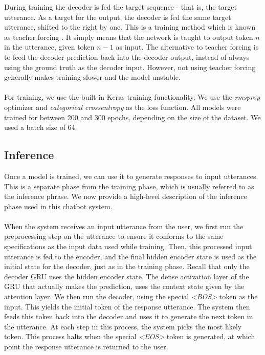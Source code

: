 \documentclass{article}
\begin{document}
During training the decoder is fed the target sequence - that is, the target
utterance. As a target for the output, the decoder is fed the same target utterance, shifted to the right by one.
This is a training method which is known as teacher forcing
\cite{teacher-forcing}. It simply means that the network is taught to output
token $n$ in the utterance, given token $n-1$ as input. The alternative to
teacher forcing is to feed the decoder prediction back into the decoder output,
instead of always using the ground truth as the decoder input. However, not
using teacher forcing generally makes training slower and the model unstable.

\paragraph{}
For training, we use the built-in Keras training functionality. We use the
\emph{rmsprop} optimizer and \emph{categorical crossentropy} as the loss
function. All models were trained for between 200 and 300 epochs, depending
on the size of the dataset. We used a batch size of 64.

\subsection*{Inference}

Once a model is trained, we can use it to generate responses to input
utterances. This is a separate phase from the training phase, which is usually
referred to as the inference phrase. We now provide a high-level description
of the inference phase used in this chatbot system.

\paragraph{}
When the system receives an input utterance from the user, we first run the
preprocessing step on the utterance to ensure it conforms to the same
specifications as the input data used while training. Then, this processed
input utterance is fed to the encoder, and the final hidden encoder state is
used as the initial state for the decoder, just as in the training phase.
Recall that only the decoder GRU uses the hidden encoder state. The dense
activation layer of the GRU that actually makes the prediction, uses the
context state given by the attention layer. We then run the decoder, using the
special \emph{<BOS>} token as the input. This yields the initial token of the
response utterance. The system then feeds this token back into the decoder and
uses it to generate the next token in the utterance. At each step in this
process, the system picks the most likely token. This process halts when the
special \emph{<EOS>} token is generated, at which point the response utterance
is returned to the user.
\end{document}
